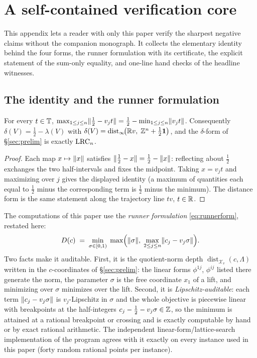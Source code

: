 
\section{A self-contained verification core}\label{sec:self}

This appendix lets a reader with only this paper verify the sharpest
negative claims without the companion monograph. It collects the
elementary identity behind the four forms, the runner formulation with
its certificate, the explicit statement of the sum-only equality, and
one-line hand checks of the headline witnesses.

\subsection{The identity and the runner formulation}

\begin{lemma}\label{lem:depthid}
For every $t\in\mathbb{T}$,
$\max_{1\le j\le n}\lVert \tfrac12-v_jt \rVert=\tfrac12-\min_{1\le j\le n}\lVert v_jt \rVert$.
Consequently $\delta(V)=\tfrac12-\lambda(V)$ with
$\delta(V)=\operatorname{dist}_\infty\!\bigl(\mathbb{R} v,\;\mathbb{Z}^n+\tfrac12\mathbf{1}
\bigr)$, and the $\delta$-form of \S\ref{sec:prelim} is exactly
$\mathrm{LRC}_n$.
\end{lemma}

\begin{proof}
Each map $x\mapsto\lVert x \rVert$ satisfies
$\lVert \tfrac12-x \rVert=\tfrac12-\lVert x \rVert$: reflecting about $\tfrac12$
exchanges the two half-intervals and fixes the midpoint. Taking $x=v_jt$
and maximizing over $j$ gives the displayed identity (a maximum of
quantities each equal to $\tfrac12$ minus the corresponding term is
$\tfrac12$ minus the minimum). The distance form is the same statement
along the trajectory line $tv$, $t\in\mathbb{R}$.
\end{proof}

The computations of this paper use the \emph{runner formulation}
\eqref{eq:runnerform}, restated here:
\[
D(c)\;=\;\min_{\sigma\in[0,1)}\;\max\Bigl(\lVert \sigma \rVert,\;
\max_{2\le j\le n}\lVert c_j-v_j\sigma \rVert\Bigr).
\]
Two facts make it auditable. First, it is the quotient-norm depth
$\operatorname{dist}_{\mathcal{X}_v}(c,\Lambda)$ written in the
$c$-coordinates of \S\ref{sec:prelim}: the linear forms $\phi^{1j}$,
$\phi^{ij}$ listed there generate the norm, the parameter $\sigma$ is the
free coordinate $x_1$ of a lift, and minimizing over $\sigma$ minimizes
over the lift. Second, it is \emph{Lipschitz-auditable}: each term
$\lVert c_j-v_j\sigma \rVert$ is $v_j$-Lipschitz in $\sigma$ and the whole
objective is piecewise linear with breakpoints at the half-integers
$c_j-\tfrac12-v_j\sigma\in\mathbb{Z}$, so the minimum is attained at a rational
breakpoint or crossing and is exactly computable by hand or by exact
rational arithmetic. The independent linear-form/lattice-search
implementation of the program agrees with it exactly on every instance
used in this paper (forty random rational points per instance).

